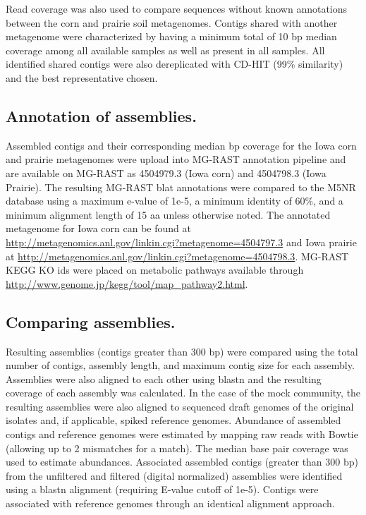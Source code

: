 \documentclass{pnastwo}
\begin{document}
\begin{article}
Read coverage was also used to compare sequences without known annotations between the corn and prairie soil metagenomes.  Contigs shared with another metagenome were characterized by 
having a minimum total of 10 bp median coverage among all available samples as well as present in all samples.  All identified shared contigs were also dereplicated with CD-HIT (99\% similarity) and the best representative chosen.

\subsection*{Annotation of assemblies.}
Assembled contigs and their corresponding median bp coverage for the
Iowa corn and prairie metagenomes were upload into MG-RAST annotation
pipeline \cite{Meyer:2008db} and are available on MG-RAST as 4504979.3 (Iowa corn)
and 4504798.3 (Iowa Prairie).  The resulting MG-RAST blat annotations
were compared to the M5NR database using a maximum e-value of 1e-5, a
minimum identity of 60\%, and a minimum alignment length of 15 aa unless otherwise noted.
The annotated metagenome for Iowa corn can be found at
\url{http://metagenomics.anl.gov/linkin.cgi?metagenome=4504797.3} and 
Iowa prairie at \url{http://metagenomics.anl.gov/linkin.cgi?metagenome=4504798.3}.
MG-RAST KEGG KO ids were placed on metabolic pathways available through  
 \url{http://www.genome.jp/kegg/tool/map_pathway2.html}.

\subsection*{Comparing assemblies.}
Resulting assemblies (contigs greater than 300 bp) were compared using
the total number of contigs, assembly length, and maximum contig size
for each assembly.  Assemblies were also aligned to each other using
blastn and the resulting coverage of each assembly was calculated.  In
the case of the mock community, the resulting assemblies were also
aligned to sequenced draft genomes of the original isolates and, if
applicable, spiked reference genomes. Abundance of assembled contigs
and reference genomes were estimated by mapping raw reads with Bowtie
(allowing up to 2 mismatches for a match).  The median base pair
coverage was used to estimate abundances.  Associated assembled
contigs (greater than 300 bp) from the unfiltered and filtered
(digital normalized) assemblies were identified using a blastn
alignment (requiring E-value cutoff of 1e-5).  Contigs were associated
with reference genomes through an identical alignment approach.


\end{article}
\end{document}
